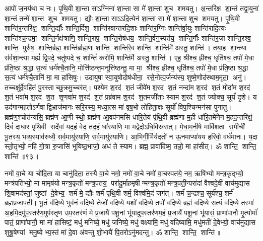 आपो॑ ज॒नय॑था च नः। पृ॒थि॒वी शा॒न्ता साऽग्निना॑ शा॒न्ता सा मे॑ शा॒न्ता शुच शमयतु। अ॒न्तरि॑क्ष शा॒न्तं तद्वा॒युना॑ शा॒न्तं तन्मे॑ शा॒न्त शुच शमयतु। द्यौः  शा॒न्ता साऽऽदि॒त्येन॑ शा॒न्ता सा मे॑ शा॒न्ता शुच शमयतु। पृ॒थि॒वी शान्ति॑र॒न्तरि॑क्ष॒ शान्ति॒र्द्यौः  शान्ति॒र्दिश॒ शान्ति॑रवान्तरदि॒शाः  शान्ति॑र॒ग्निः  शान्ति॑र्वा॒युः  शान्ति॑रादि॒त्यः  शान्ति॑श्च॒न्द्रमा॒ शान्ति॒र्नक्ष॑त्राणि॒ शान्ति॒राप॒ शान्ति॒रोष॑धय॒ शान्ति॒र्वन॒स्पत॑य॒ शान्ति॒र्गौः  शान्ति॑र॒जा शान्ति॒रश्व॒ शान्ति॒ पुरु॑ष॒ शान्ति॒र्ब्रह्म॒ शान्ति॑र्ब्राह्म॒णः  शान्ति॒ शान्ति॑रे॒व शान्ति॒ शान्ति॑र्मे अस्तु॒ शान्ति॑। तया॒ह शा॒न्त्या स॑र्वशा॒न्त्या मह्यं॑ द्वि॒पदे॒ चतु॑ष्पदे च॒ शान्तिं॑ करोमि॒ शान्ति॑र्मे अस्तु॒ शान्ति॑। एह॒ श्रीश्च॒ ह्रीश्च॒ धृति॑श्च॒ तपो॑ मे॒धा प्र॑ति॒ष्ठा श्र॒द्धा स॒त्यं धर्म॑श्चै॒तानि॒ मोत्ति॑ष्ठन्त॒मनूत्ति॑ष्ठन्तु॒ मा मा॒ श्रीश्च॒ ह्रीश्च॒ धृति॑श्च॒ तपो॑ मे॒धा प्र॑ति॒ष्ठा श्र॒द्धा स॒त्यं धर्म॑श्चै॒तानि॑ मा॒ मा हा॑सिषुः। उदायु॑षा स्वा॒युषोदोष॑धीना॒ रसे॒नोत्प॒र्जन्य॑स्य॒ शुष्मे॒णोद॑स्थाम॒मृता॒ अनु॑। तच्चक्षु॑र्दे॒वहि॑तं पु॒रस्ताच्छु॒क्रमु॒च्चर॑त्। पश्ये॑म श॒रद॑ श॒तं जीवे॑म श॒रद॑ श॒तं नन्दा॑म श॒रद॑ श॒तं मोदा॑म श॒रद॑ श॒तं भवा॑म श॒रद॑ श॒त शृ॒णवा॑म श॒रद॑ श॒तं प्रब्र॑वाम श॒रद॑ श॒तमजी॑ताः स्याम श॒रद॑ श॒तं ज्योक्च॒ सूर्यं॑ दृ॒शे। य उद॑गान्मह॒तोऽर्णवाद्वि॒भ्राज॑मानः सरि॒रस्य॒ मध्या॒त्स मा॑ वृष॒भो लो॑हिता॒क्षः सूर्यो॑ विप॒श्चिन्मन॑सा पुनातु। ब्रह्म॑ण॒श्चोत॑न्यसि॒ ब्रह्म॑ण आ॒णी स्थो॒ ब्रह्म॑ण आ॒वप॑नमसि धारि॒तेयं पृ॑थि॒वी ब्रह्म॑णा म॒ही धा॑रि॒तमे॑नेन म॒हद॒न्तरि॑क्षं॒ दिवं॑ दाधार पृथि॒वी सदे॑वां॒ यद॒हं वेद॒ तद॒हं धा॑रयाणि॒ मा मद्वेदोऽधि॒विस्र॑सत्। मे॒धा॒म॒नी॒षे मावि॑शता स॒मीची॑ भू॒तस्य॒ भव्य॒स्याव॑रुध्यै॒ सर्व॒मायु॑रयाणि॒ सर्व॒मायु॑रयाणि। आ॒भिर्गी॒र्भिर्यदतो॑ न ऊ॒नमाप्या॑यय हरिवो॒ वर्ध॑मानः। य॒दा स्तो॒तृभ्यो॒ महि॑ गो॒त्रा रु॒जासि॑ भूयिष्ठ॒भाजो॒ अध॑ ते स्याम। ब्रह्म॒ प्रावा॑दिष्म॒ तन्नो॒ मा हा॑सीत्। ॐ शान्ति॒ शान्ति॒ शान्ति॑॥९३॥\anuvakamend[प॒रा॒वतो॑ दधातु ब॒द्धां जिन्व॑थ दृ॒शे स॒प्त च॑]

नमो॑ वा॒चे या चो॑दि॒ता या चानु॑दिता॒ तस्यै॑ वा॒चे नमो॒ नमो॑ वा॒चे नमो॑ वा॒चस्पत॑ये॒ नम॒ ऋषि॑भ्यो मन्त्र॒कृद्भ्यो॒ मन्त्र॑पतिभ्यो॒ मा मामृष॑यो मन्त्र॒कृतो॑ मन्त्र॒पत॑य॒ परा॑दु॒र्माहमृषीन्मन्त्र॒कृतो॑ मन्त्र॒पती॒न्परा॑दां वैश्वदे॒वीं वाच॑मुद्यास शि॒वामद॑स्तां॒ जुष्टां दे॒वेभ्य॒ शर्म॑ मे॒ द्यौः  शर्म॑ पृथि॒वी शर्म॒ विश्व॑मि॒दं जग॑त्। शर्म॑ च॒न्द्रश्च॒ सूर्य॑श्च॒ शर्म॑ ब्रह्मप्रजाप॒ती। भू॒तं व॑दिष्ये॒ भुव॑नं वदिष्ये॒ तेजो॑ वदिष्ये॒ यशो॑ वदिष्ये॒ तपो॑ वदिष्ये॒ ब्रह्म॑ वदिष्ये स॒त्यं व॑दिष्ये॒ तस्मा॑ अ॒हमि॒दमु॑प॒स्तर॑ण॒मुप॑स्तृण उप॒स्तर॑णं मे प्र॒जायै॑ पशू॒नां भू॑यादुप॒स्तर॑णम॒हं प्र॒जायै॑ पशू॒नां भू॑यासं॒ प्राणा॑पानौ मृ॒त्योर्मा॑ पातं॒ प्राणा॑पानौ॒ मा मा॑ हासिष्टं॒ मधु॑ मनिष्ये॒ मधु॑ जनिष्ये॒ मधु॑ वक्ष्यामि॒ मधु॑ वदिष्यामि॒ मधु॑मतीं दे॒वेभ्यो॒ वाच॑मुद्यास शुश्रू॒षेण्यां मनु॒ष्येभ्य॒स्तं मा॑ दे॒वा अ॑वन्तु शो॒भायै॑ पि॒तरोऽनु॑मदन्तु। ॐ शान्ति॒ शान्ति॒ शान्ति॑॥ 

\closesection